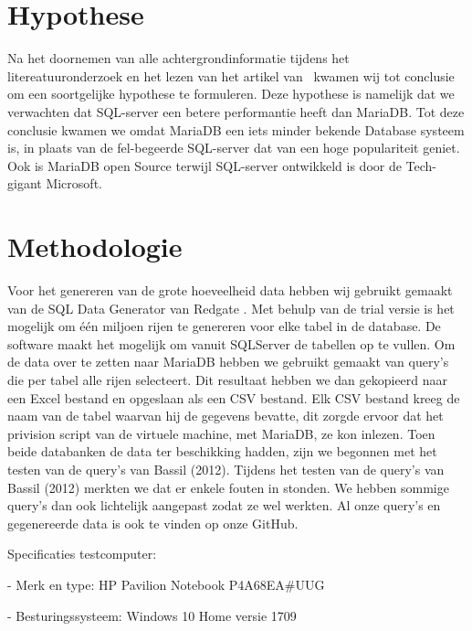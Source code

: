 \documentclass[fleqn,10pt]{artikeltin}
\begin{document}
\section{Hypothese}
\label{sec:Hypothese}

Na het doornemen van alle achtergrondinformatie tijdens het litereatuuronderzoek en het lezen van het artikel van~\cite{Bassil2012} kwamen wij tot conclusie om een soortgelijke hypothese te formuleren. Deze hypothese is namelijk dat we verwachten dat SQL-server een betere performantie heeft dan MariaDB. Tot deze conclusie kwamen we omdat MariaDB een iets minder bekende Database systeem is, in plaats van de fel-begeerde SQL-server dat van een hoge populariteit geniet. Ook is MariaDB open Source terwijl SQL-server ontwikkeld is door de Tech-gigant Microsoft.
\section{Methodologie}
\label{sec:methodologie}
Voor het genereren van de grote hoeveelheid data hebben wij gebruikt gemaakt van de SQL Data Generator van Redgate . Met behulp van de trial versie is het mogelijk om één miljoen rijen te genereren voor elke tabel in de database. De software maakt het mogelijk om vanuit SQLServer de tabellen op te vullen.
Om de data over te zetten naar MariaDB hebben we gebruikt gemaakt van query’s die per tabel alle rijen selecteert. Dit resultaat hebben we dan gekopieerd naar een Excel bestand en opgeslaan als een CSV bestand. Elk CSV bestand kreeg de naam van de tabel waarvan hij de gegevens bevatte, dit zorgde ervoor dat het privision script van de virtuele machine, met MariaDB, ze kon inlezen.
Toen beide databanken de data ter beschikking hadden, zijn we begonnen met het testen van de query’s van Bassil (2012). Tijdens het testen van de query’s van Bassil (2012) merkten we dat er enkele fouten in stonden. We hebben sommige query’s dan ook lichtelijk aangepast zodat ze wel werkten. Al onze query’s en gegenereerde data is ook te vinden op onze GitHub.
\newpage

Specificaties testcomputer: 
\vspace{10mm} %

-	Merk en type: HP Pavilion Notebook P4A68EA\#UUG

\vspace{5mm} %

-	Besturingssysteem: Windows 10 Home versie 1709

\vspace{5mm} %
\end{document}
